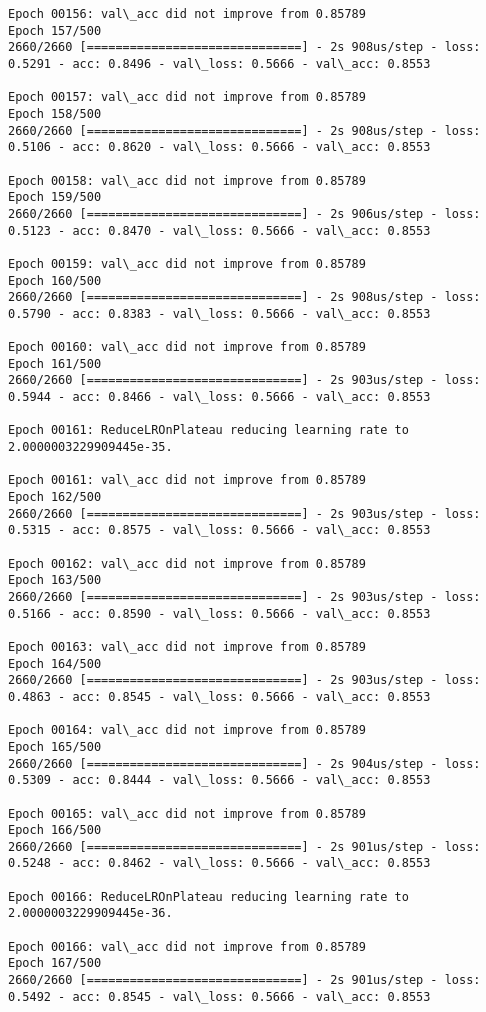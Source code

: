 \documentclass[11pt]{article}
\begin{document}
\begin{Verbatim}[commandchars=\\\{\}]
Epoch 00156: val\_acc did not improve from 0.85789
Epoch 157/500
2660/2660 [==============================] - 2s 908us/step - loss: 0.5291 - acc: 0.8496 - val\_loss: 0.5666 - val\_acc: 0.8553

Epoch 00157: val\_acc did not improve from 0.85789
Epoch 158/500
2660/2660 [==============================] - 2s 908us/step - loss: 0.5106 - acc: 0.8620 - val\_loss: 0.5666 - val\_acc: 0.8553

Epoch 00158: val\_acc did not improve from 0.85789
Epoch 159/500
2660/2660 [==============================] - 2s 906us/step - loss: 0.5123 - acc: 0.8470 - val\_loss: 0.5666 - val\_acc: 0.8553

Epoch 00159: val\_acc did not improve from 0.85789
Epoch 160/500
2660/2660 [==============================] - 2s 908us/step - loss: 0.5790 - acc: 0.8383 - val\_loss: 0.5666 - val\_acc: 0.8553

Epoch 00160: val\_acc did not improve from 0.85789
Epoch 161/500
2660/2660 [==============================] - 2s 903us/step - loss: 0.5944 - acc: 0.8466 - val\_loss: 0.5666 - val\_acc: 0.8553

Epoch 00161: ReduceLROnPlateau reducing learning rate to 2.0000003229909445e-35.

Epoch 00161: val\_acc did not improve from 0.85789
Epoch 162/500
2660/2660 [==============================] - 2s 903us/step - loss: 0.5315 - acc: 0.8575 - val\_loss: 0.5666 - val\_acc: 0.8553

Epoch 00162: val\_acc did not improve from 0.85789
Epoch 163/500
2660/2660 [==============================] - 2s 903us/step - loss: 0.5166 - acc: 0.8590 - val\_loss: 0.5666 - val\_acc: 0.8553

Epoch 00163: val\_acc did not improve from 0.85789
Epoch 164/500
2660/2660 [==============================] - 2s 903us/step - loss: 0.4863 - acc: 0.8545 - val\_loss: 0.5666 - val\_acc: 0.8553

Epoch 00164: val\_acc did not improve from 0.85789
Epoch 165/500
2660/2660 [==============================] - 2s 904us/step - loss: 0.5309 - acc: 0.8444 - val\_loss: 0.5666 - val\_acc: 0.8553

Epoch 00165: val\_acc did not improve from 0.85789
Epoch 166/500
2660/2660 [==============================] - 2s 901us/step - loss: 0.5248 - acc: 0.8462 - val\_loss: 0.5666 - val\_acc: 0.8553

Epoch 00166: ReduceLROnPlateau reducing learning rate to 2.0000003229909445e-36.

Epoch 00166: val\_acc did not improve from 0.85789
Epoch 167/500
2660/2660 [==============================] - 2s 901us/step - loss: 0.5492 - acc: 0.8545 - val\_loss: 0.5666 - val\_acc: 0.8553


\end{Verbatim}
\end{document}
